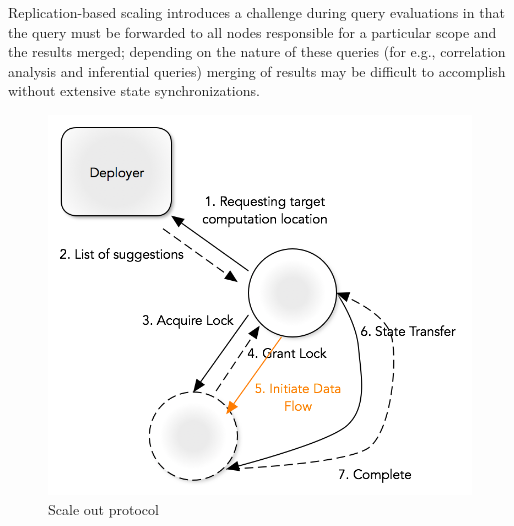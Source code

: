 Replication-based scaling introduces a challenge during query evaluations in that the query must be forwarded to all nodes responsible for a particular scope and the results merged; depending on the nature of these queries (for e.g., correlation analysis and inferential queries) merging of results may be difficult to accomplish without extensive state synchronizations.
%
\begin{figure}
    \centerline{\includegraphics[scale=0.55]{figures/scale-out-protocol.png}}
    \caption{Scale out protocol}
    \label{fig:scale-out-protocol}
\end{figure}
%
